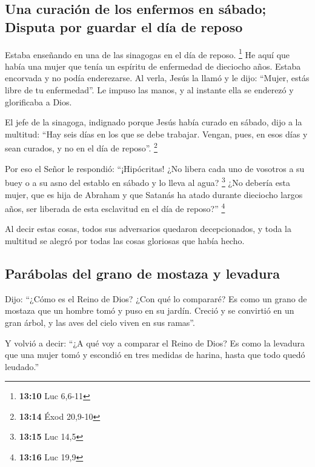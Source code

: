 \hypertarget{una-curaciuxf3n-de-los-enfermos-en-suxe1bado-disputa-por-guardar-el-duxeda-de-reposo}{%
\subsection{Una curación de los enfermos en sábado; Disputa por guardar
el día de
reposo}\label{una-curaciuxf3n-de-los-enfermos-en-suxe1bado-disputa-por-guardar-el-duxeda-de-reposo}}

 Estaba enseñando en una de las sinagogas en el día de
reposo. \footnote{\textbf{13:10} Luc 6,6-11}  He aquí que
había una mujer que tenía un espíritu de enfermedad de dieciocho años.
Estaba encorvada y no podía enderezarse.  Al verla, Jesús
la llamó y le dijo: ``Mujer, estás libre de tu enfermedad''.
 Le impuso las manos, y al instante ella se enderezó y
glorificaba a Dios.

 El jefe de la sinagoga, indignado porque Jesús había
curado en sábado, dijo a la multitud: ``Hay seis días en los que se debe
trabajar. Vengan, pues, en esos días y sean curados, y no en el día de
reposo''. \footnote{\textbf{13:14} Éxod 20,9-10}

 Por eso el Señor le respondió: ``¡Hipócritas! ¿No libera
cada uno de vosotros a su buey o a su asno del establo en sábado y lo
lleva al agua? \footnote{\textbf{13:15} Luc 14,5}  ¿No
debería esta mujer, que es hija de Abraham y que Satanás ha atado
durante dieciocho largos años, ser liberada de esta esclavitud en el día
de reposo?'' \footnote{\textbf{13:16} Luc 19,9}

 Al decir estas cosas, todos sus adversarios quedaron
decepcionados, y toda la multitud se alegró por todas las cosas
gloriosas que había hecho.

\hypertarget{paruxe1bolas-del-grano-de-mostaza-y-levadura}{%
\subsection{Parábolas del grano de mostaza y
levadura}\label{paruxe1bolas-del-grano-de-mostaza-y-levadura}}

 Dijo: ``¿Cómo es el Reino de Dios? ¿Con qué lo
compararé?  Es como un grano de mostaza que un hombre
tomó y puso en su jardín. Creció y se convirtió en un gran árbol, y las
aves del cielo viven en sus ramas''.

 Y volvió a decir: ``¿A qué voy a comparar el Reino de
Dios?  Es como la levadura que una mujer tomó y escondió
en tres medidas de harina, hasta que todo quedó leudado.''

